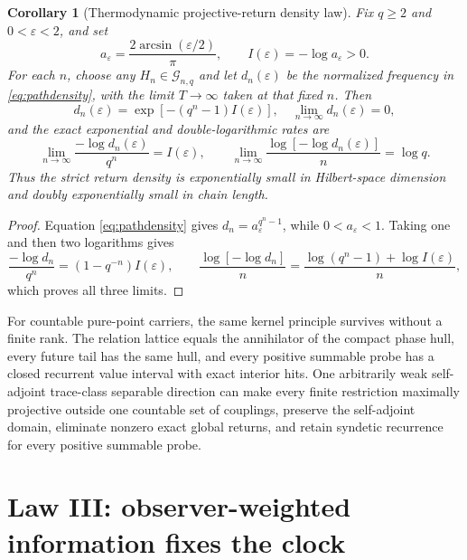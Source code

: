 \documentclass[10pt]{article}
\newtheorem{corollary}[theorem]{Corollary}
\theoremstyle{definition}
\begin{document}
\begin{corollary}[Thermodynamic projective-return density law]
\label{cor:thermodynamic}
Fix $q\ge2$ and $0<\varepsilon<2$, and set
\begin{equation}
 a_\varepsilon=\frac{2\arcsin(\varepsilon/2)}{\pi},
 \qquad I(\varepsilon)=-\log a_\varepsilon>0.          \label{eq:thermorate}
\end{equation}
For each $n$, choose any $H_n\in\mathcal G_{n,q}$ and let $d_n(\varepsilon)$
be the normalized frequency in \eqref{eq:pathdensity}, with the limit
$T\to\infty$ taken at that fixed $n$.  Then
\begin{equation}
 d_n(\varepsilon)
 =\exp\!\left[-(q^n-1)I(\varepsilon)\right],
 \quad
 \lim_{n\to\infty}d_n(\varepsilon)=0,                 \label{eq:thermodensity}
\end{equation}
and the exact exponential and double-logarithmic rates are
\begin{equation}
 \boxed{
 \lim_{n\to\infty}\frac{-\log d_n(\varepsilon)}{q^n}
 =I(\varepsilon),\qquad
 \lim_{n\to\infty}\frac{\log[-\log d_n(\varepsilon)]}{n}
 =\log q.}                                             \label{eq:thermolimits}
\end{equation}
Thus the strict return density is exponentially small in Hilbert-space
dimension and doubly exponentially small in chain length.
\end{corollary}

\begin{proof}
Equation \eqref{eq:pathdensity} gives
$d_n=a_\varepsilon^{q^n-1}$, while $0<a_\varepsilon<1$.  Taking one and then
two logarithms gives
\[
 \frac{-\log d_n}{q^n}=(1-q^{-n})I(\varepsilon),
 \qquad
 \frac{\log[-\log d_n]}{n}
 =\frac{\log(q^n-1)+\log I(\varepsilon)}{n},
\]
which proves all three limits.
\end{proof}

For countable pure-point carriers, the same kernel principle survives without
a finite rank.  The relation lattice equals the annihilator of the compact
phase hull, every future tail has the same hull, and every positive summable
probe has a closed recurrent value interval with exact interior hits.  One
arbitrarily weak self-adjoint trace-class separable direction can make every
finite restriction maximally projective outside one countable set of
couplings, preserve the self-adjoint domain, eliminate nonzero exact global
returns, and retain syndetic recurrence for every positive summable probe.

\section{Law III: observer-weighted information fixes the clock}
\end{document}
